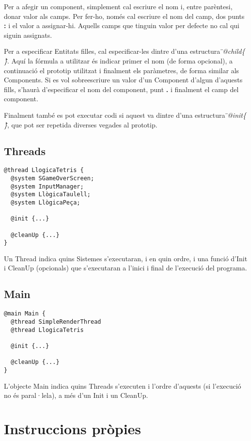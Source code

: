 Per a afegir un component, simplement cal escriure el nom i, entre parèntesi, donar valor als camps. Per fer-ho, només cal escriure el nom del camp, dos punts {\bf :} i el valor a assignar-hi. Aquells camps que tinguin valor per defecte no cal qui siguin assignats.

Per a especificar Entitats filles, cal especificar-les dintre d'una estructura {\em\"{}@child\{ \}\"{}}. Aquí la fórmula a utilitzar és indicar primer el nom (de forma opcional), a continuació el prototip utilitzat i finalment els paràmetres, de forma similar als Components. Si es vol sobreescriure un valor d'un Component d'algun d'aquests fills, s'haurà d'especificar el nom del component, punt {\bf .} i finalment el camp del component.

Finalment també es pot executar codi si aquest va dintre d'una estructura {\em\"{}@init\{ \}\"{}}, que pot ser repetida diverses vegades al prototip.

\subsection{Threads}

\begin{verbatim}
@thread LlogicaTetris {
  @system SGameOverScreen;
  @system InputManager;
  @system LlògicaTaulell;
  @system LlògicaPeça;
  
  @init {...}
  
  @cleanUp {...}
}
\end{verbatim}

Un Thread indica quins Sistemes s'executaran, i en quin ordre, i una funció d'Init i CleanUp (opcionals) que s'executaran a l'inici i final de l'execució del programa.

\subsection{Main}

\begin{verbatim}
@main Main {
  @thread SimpleRenderThread
  @thread LlogicaTetris
  
  @init {...}
  
  @cleanUp {...}
}
\end{verbatim}

L'objecte Main indica quins Threads s'executen i l'ordre d'aquests (si l'execució no és paral·lela), a més d'un Init i un CleanUp.

\section{Instruccions pròpies}

